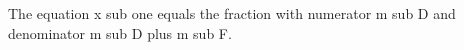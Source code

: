 The equation x sub one equals the fraction with numerator m sub D and denominator m sub D plus m sub F.